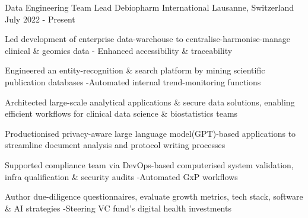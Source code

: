 

\begin{cventries}

\vspace{-0.3cm}
 \cventry
    {Data Engineering Team Lead} %
    {Debiopharm International} %
    {Lausanne, Switzerland} %
    {July 2022 - Present} %
    {
      \begin{cvitems} %
        \item {Led development of enterprise data-warehouse to centralise-harmonise-manage clinical \& geomics data - Enhanced accessibility \& traceability}
        \item {Engineered an entity-recognition \& search platform by mining scientific publication databases -Automated internal trend-monitoring functions}
        \item {Architected large-scale analytical applications \& secure data solutions, enabling efficient workflows for clinical data science \& biostatistics teams}
        \item {Productionised privacy-aware large language model(GPT)-based applications to streamline document analysis and protocol writing processes}
        \item {Supported compliance team via DevOps-based computerised system validation, infra qualification \& security audits -Automated GxP workflows}
        \item {Author due-diligence questionnaires, evaluate growth metrics, tech stack, software \& AI strategies -Steering VC fund's digital health investments}
      \end{cvitems}
    }
	
	\vspace{-0.1cm}
	

\end{cventries}
